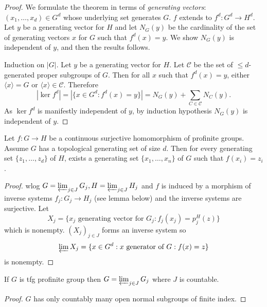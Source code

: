 \documentclass[a4paper]{article}
\begin{document}
\begin{proof}
  We formulate the theorem in terms of \emph{generating vectors}: \((x_1, \dots, x_d) \in G^d\) whose underlying set generates \(G\). \(f\) extends to \(f^d: G^d \to H^d\). Let \(y\) be a generating vector for \(H\) and let \(N_G(y)\) be the cardinality of the set of generating vectors \(x\) for \(G\) such that \(f^d(x) = y\). We show \(N_G(y)\) is independent of \(y\), and then the results follows.

  Induction on \(|G|\). Let \(y\) be a generating vector for \(H\). Let \(\mathcal C\) be the set of \(\leq d\)-generated proper subgroups of \(G\). Then for all \(x\) such that \(f^d(x) = y\), either \(\langle x \rangle = G\) or \(\langle x\rangle \in \mathcal C\). Therefore
  \[
    |\ker f^d| = |\{x \in G^d: f^d(x) = y\}| = N_G(y) + \sum_{C \in \mathcal C} N_C(y).
  \]
  As \(\ker f^d\) is manifestly independent of \(y\), by induction hypothesis \(N_G(y)\) is independent of \(y\).
\end{proof}

\begin{theorem}
  Let \(f: G \to H\) be a continuous surjective homomorphism of profinite groups. Assume \(G\) has a topological generating set of size \(d\). Then for every generating set \(\{z_1, \dots, z_d\}\) of \(H\), exists a generating set \(\{x_1, \dots, x_n\}\) of \(G\) such that \(f(x_i) = z_i\).
\end{theorem}

\begin{proof}
  wlog \(G = \varprojlim_{j \in J} G_j, H = \varprojlim_{j \in J} H_j\) and \(f\) is induced by a morphism of inverse systems \(f_j: G_j \to H_j\) (see lemma below) and the inverse systems are surjective. Let
  \[
    X_j = \{x_j \text{ generating vector for } G_j: f_j(x_j) = p_j^H(z)\}
  \]
  which is nonempty. \((X_j)_{j \in J}\) forms an inverse system so
  \[
    \varprojlim X_j = \{x \in G^d: x \text{ generator of } G: f(x) = z\}
  \]
  is nonempty.
\end{proof}

\begin{lemma}
  If \(G\) is tfg profinite group then \(G = \varprojlim_{j \in J} G_j\) where \(J\) is countable.
\end{lemma}

\begin{proof}
  \(G\) has only countably many open normal subgroups of finite index.
\end{proof}
\end{document}
